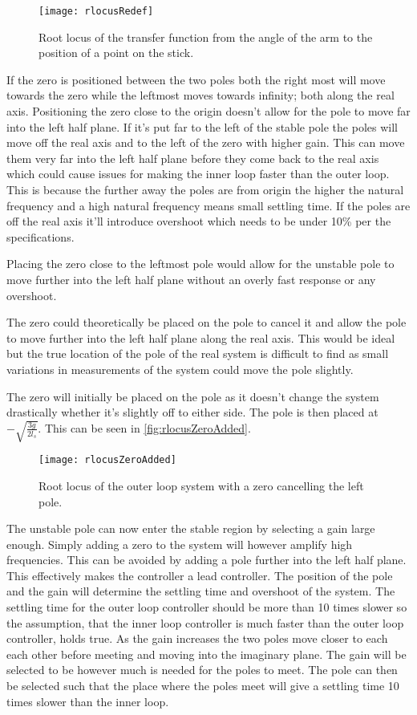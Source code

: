 \begin{figure}[htbp]
\centering
\texttt{[image: rlocusRedef]}
\caption{Root locus of the transfer function from the angle of the arm to the position of a point on the stick.}
\label{fig:locusxa}
\end{figure}

If the zero is positioned between the two poles both the right most will move towards the zero while the leftmost moves towards infinity; both along the real axis. Positioning the zero close to the origin doesn't allow for the pole to move far into the left half plane. If it's put far to the left of the stable pole the poles will move off the real axis and to the left of the zero with higher gain. This can move them very far into the left half plane before they come back to the real axis which could cause issues for making the inner loop faster than the outer loop. This is because the further away the poles are from origin the higher the natural frequency and a high natural frequency means small settling time. If the poles are off the real axis it'll introduce overshoot which needs to be under 10\% per the specifications. 

Placing the zero close to the leftmost pole would allow for the unstable pole to move further into the left half plane without an overly fast response or any overshoot. 

The zero could theoretically be placed on the pole to cancel it and allow the pole to move further into the left half plane along the real axis. This would be ideal but the true location of the pole of the real system is difficult to find as small variations in measurements of the system could move the pole slightly. 

The zero will initially be placed on the pole as it doesn't change the system drastically whether it's slightly off to either side. The pole is then placed at $-\sqrt{\frac{3g}{2l_s}}$. This can be seen in \autoref{fig:rlocusZeroAdded}.

\begin{figure}[htbp]
\centering
\texttt{[image: rlocusZeroAdded]}
\caption{Root locus of the outer loop system with a zero cancelling the left pole.}
\label{fig:rlocusZeroAdded}
\end{figure}

The unstable pole can now enter the stable region by selecting a gain large enough. Simply adding a zero to the system will however amplify high frequencies. This can be avoided by adding a pole further into the left half plane. This effectively makes the controller a lead controller. The position of the pole and the gain will determine the settling time and overshoot of the system. The settling time for the outer loop controller should be more than 10 times slower so the assumption, that the inner loop controller is much faster than the outer loop controller, holds true. As the gain increases the two poles move closer to each each other before meeting and moving into the imaginary plane. The gain will be selected to be however much is needed for the poles to meet. The pole can then be selected such that the place where the poles meet will give a settling time 10 times slower than the inner loop.


